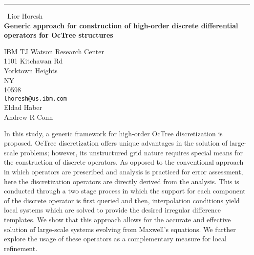 \documentclass{report}
\begin{document}
\begin{center}
\rule{6in}{1pt} \
{\large Lior Horesh \\
{\bf Generic approach for construction of high-order discrete differential operators for OcTree structures}}

IBM TJ Watson Research Center \\ 1101 Kitchawan Rd \\ Yorktown Heights \\ NY \\ 10598
\\
{\tt lhoresh@us.ibm.com}\\
Eldad Haber\\
Andrew R Conn\end{center}

In this study, a generic framework for high-order OcTree discretization
is proposed. OcTree discretization offers unique advantages in the
solution of large-scale problems; however, its unstructured grid nature
requires special means for the construction of discrete operators. As
opposed to the conventional approach in which operators are prescribed
and analysis is practiced for error assessment, here the discretization
operators are directly derived from the analysis. This is conducted
through a two stage process in which the support for each component of
the discrete operator is first queried and then, interpolation conditions
yield local systems which are solved to provide the desired irregular
difference templates. We show that this approach allows for the accurate
and effective solution of large-scale systems evolving from Maxwell's
equations. We further explore the usage of these operators as a
complementary measure for local refinement.
\end{document}
